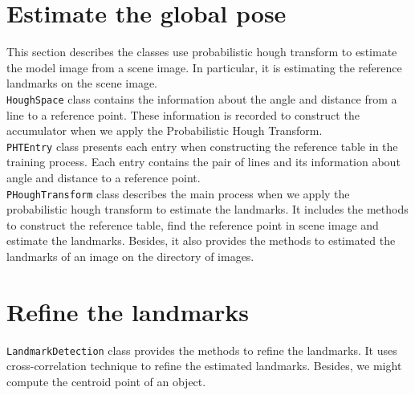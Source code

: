 \section{Estimate the global pose}
This section describes the classes use probabilistic hough transform to estimate the model image from a scene image. In particular, it is estimating the reference landmarks on the scene image.\\[0.2cm]
\texttt{HoughSpace} class contains the information about the angle and distance from a line to a reference point. These information is recorded to construct the accumulator when we apply the Probabilistic Hough Transform.\\[0.2cm]
\texttt{PHTEntry} class presents each entry when constructing the reference table in the training process. Each entry contains the pair of lines and its information about angle and distance to a reference point.\\[0.2cm]
\texttt{PHoughTransform} class describes the main process when we apply the probabilistic hough transform to estimate the landmarks. It includes the methods to construct the reference table, find the reference point in scene image and estimate the landmarks. Besides, it also provides the methods to estimated the landmarks of an image on the directory of images.
\section{Refine the landmarks}
\texttt{LandmarkDetection} class provides the methods to refine the landmarks. It uses cross-correlation technique to refine the estimated landmarks. Besides, we might compute the centroid point of an object.